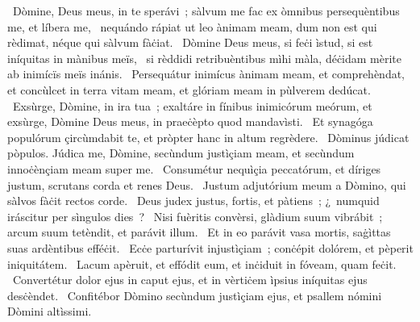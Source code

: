 ~Dòmine, Deus meus, in te sperávi~; sàlvum me fac ex òmnibus persequèntibus me, et líbera me, 
~nequándo rápiat ut leo ànimam meam, dum non est qui rèdimat, néque qui sàlvum fàċiat. 
~Dòmine Deus meus, si feċi ìstud, si est iníquitas in mànibus meïs, 
~si rèddidi retribuèntibus mìhi màla, déċidam mèrite ab inimícïs meïs inánis. 
~Persequátur inimícus ànimam meam, et comprehèndat, et concùlcet in terra vitam meam, et glóriam meam in pùlverem dedúcat. 
~Exsùrge, Dòmine, in ira tua~; exaltáre in fínibus inimicórum meórum, et exsùrge, Dòmine Deus meus, in praeċèpto quod mandavìsti. 
~Et synagóga populórum çircùmdabit te, et pròpter hanc in altum regrèdere. 
~Dòminus júdicat pòpulos. Júdica me, Dòmine, secùndum justìçiam meam, et secùndum innoċènçiam meam super me. 
~Consumétur nequìçia peccatórum, et díriges justum, scrutans corda et renes Deus. 
~Justum adjutórium meum a Dòmino, qui sàlvos fàċit rectos corde. 
~Deus judex justus, fortis, et pàtiens~; ¿~numquid iráscitur per sìngulos dies~? 
~Nisi fuèritis convèrsi, glàdium suum vibrábit~; arcum suum tetèndit, et parávit illum. 
~Et in eo parávit vasa mortis, saġìttas suas ardèntibus efféċit. 
~Ecċe parturívit injustìçiam~; conċépit dolórem, et pèperit iniquitátem. 
~Lacum apèruit, et effódit eum, et inċiduit in fóveam, quam feċit. 
~Convertétur dolor ejus in caput ejus, et in vèrtiċem ìpsius iníquitas ejus desċèndet. 
~Confitébor Dòmino secùndum justìçiam ejus, et psallem nómini Dòmini altìssimi. 
